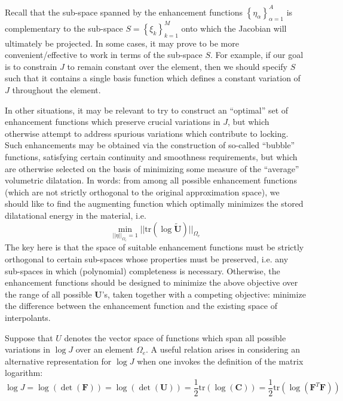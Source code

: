 \documentclass[12pt]{book}
\begin{document}
Recall that the sub-space spanned by the enhancement functions $\left\{ \eta_{\alpha} \right\}_{\alpha = 1}^A$ is complementary to the sub-space $S = \left\{ \xi_k \right\}_{k = 1}^M$ onto which the Jacobian will ultimately be projected. In some cases, it may prove to be more convenient/effective to work in terms of the sub-space $S$. For example, if our goal is to constrain $J$ to remain constant over the element, then we should specify $S$ such that it contains a single basis function which defines a constant variation of $J$ throughout the element.

In other situations, it may be relevant to try to construct an ``optimal'' set of enhancement functions which preserve crucial variations in $J$, but which otherwise attempt to address spurious variations which contribute to locking. Such enhancements may be obtained via the construction of so-called ``bubble'' functions, satisfying certain continuity and smoothness requirements, but which are otherwise selected on the basis of minimizing some measure of the ``average'' volumetric dilatation. In words: from among all possible enhancement functions (which are not strictly orthogonal to the original approximation space), we should like to find the augmenting function which optimally minimizes the stored dilatational energy in the material, i.e.
\begin{equation}
  \min_{|| \eta ||_{\Omega_e} = 1} || \text{tr} (\log \tilde{\mathbf{U}}) ||_{\Omega_e}
\end{equation}
The key here is that the space of suitable enhancement functions must be strictly orthogonal to certain sub-spaces whose properties must be preserved, i.e. any sub-spaces in which (polynomial) completeness is necessary. Otherwise, the enhancement functions should be designed to minimize the above objective over the range of all possible $\mathbf{U}$'s, taken together with a competing objective: minimize the difference between the enhancement function and the existing space of interpolants.

Suppose that $U$ denotes the vector space of functions which span all possible variations in $\log J$ over an element $\Omega_e$. A useful relation arises in considering an alternative representation for $\log J$ when one invokes the definition of the matrix logarithm:
\begin{equation}
  \log J = \log (\det (\mathbf{F})) = \log (\det (\mathbf{U})) = \frac{1}{2} \text{tr} (\log (\mathbf{C})) = \frac{1}{2} \text{tr} (\log (\mathbf{F}^T \mathbf{F}))
\end{equation}
\end{document}
